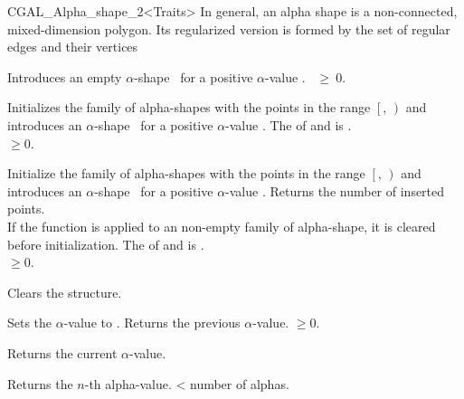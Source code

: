 \begin{ccClassTemplate} {CGAL_Alpha_shape_2<Traits>}
{ In general, an alpha shape is a non-connected, mixed-dimension
polygon. Its regularized version is formed by the set of regular edges
and their vertices}

\ccCreation
{}

{Introduces an empty $\alpha$-shape \ccVar\ for a positive $\alpha$-value
 .
\ccPrecond {}~$\geq~0$.}


{Initializes the family of alpha-shapes with the points in the range
$\left[\right.$, $\left.\right)$ and 
introduces an $\alpha$-shape \ccVar\ for a positive $\alpha$-value
.  
\ccPrecond The  of  and
 is .\\
 $\geq 0$.}

\ccOperations

{Initialize the family of alpha-shapes with the points in the range
$\left[\right.$, $\left.\right)$ and 
introduces an $\alpha$-shape \ccVar\ for a positive $\alpha$-value
. Returns the number of inserted points. \\
If the function is applied to an non-empty family of alpha-shape, it is cleared
before initialization.
\ccPrecond The  of  and
 is .\\
 $\geq 0$.}

{Clears the structure.}

{Sets the $\alpha$-value to .
 Returns the previous $\alpha$-value.
\ccPrecond {} $\geq 0$.}

{Returns the current $\alpha$-value.}

{Returns the $n$-th alpha-value.
 \ccPrecond {} < number of alphas.}


\end{ccClassTemplate}
